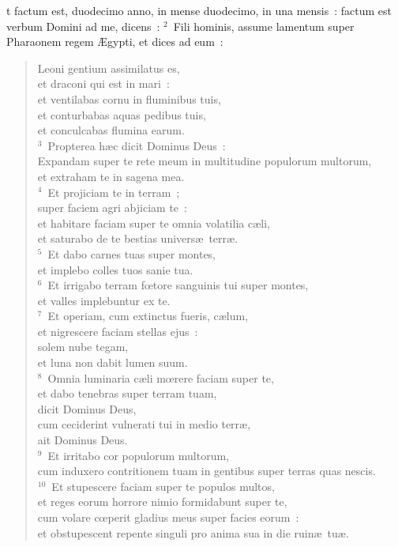 \bchapter
{}t factum est, duodecimo anno, in mense duodecimo, in una mensis~: factum est verbum Domini ad me, dicens~:
${}^{2}$~Fili hominis, assume lamentum super Pharaonem regem \AE gypti, et dices ad eum~: \begin{flushleft}\begin{verse}Leoni gentium assimilatus es,\\ et draconi qui est in mari~:\\ et ventilabas cornu in fluminibus tuis,\\ et conturbabas aquas pedibus tuis,\\ et conculcabas flumina earum.\\
${}^{3}$~Propterea h\ae c dicit Dominus Deus~:\\ Expandam super te rete meum in multitudine populorum multorum,\\ et extraham te in sagena mea.\\
${}^{4}$~Et projiciam te in terram~;\\ super faciem agri abjiciam te~:\\ et habitare faciam super te omnia volatilia c\ae li,\\ et saturabo de te bestias univers\ae\ terr\ae .\\
${}^{5}$~Et dabo carnes tuas super montes,\\ et implebo colles tuos sanie tua.\\
${}^{6}$~Et irrigabo terram fœtore sanguinis tui super montes,\\ et valles implebuntur ex te.\\
${}^{7}$~Et operiam, cum extinctus fueris, c\ae lum,\\ et nigrescere faciam stellas ejus~:\\ solem nube tegam,\\ et luna non dabit lumen suum.\\
${}^{8}$~Omnia luminaria c\ae li mœrere faciam super te,\\ et dabo tenebras super terram tuam,\\ dicit Dominus Deus,\\ cum ceciderint vulnerati tui in medio terr\ae ,\\ ait Dominus Deus.\\
${}^{9}$~Et irritabo cor populorum multorum,\\ cum induxero contritionem tuam in gentibus super terras quas nescis.\\
${}^{10}$~Et stupescere faciam super te populos multos,\\ et reges eorum horrore nimio formidabunt super te,\\ cum volare cœperit gladius meus super facies eorum~:\\ et obstupescent repente singuli pro anima sua in die ruin\ae\ tu\ae .\\

\end{verse}
\end{flushleft}
